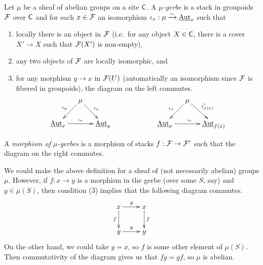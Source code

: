 \begin{definition}
 Let $\mu$ be a sheaf of abelian groups on a site $\text{\sf C}$. A \emph{$\mu$-gerbe} is a stack in groupoids $\mathcal{F}$ over $\text{\sf C}$ and for each $x\in \mathcal{F}$ an isomorphism $\iota_x:\mu\xrightarrow\sim \operatorname{\underline{Aut}}_x$ such that
 \begin{enumerate}
   \item locally there is an object in $\mathcal{F}$ (i.e.~for any object $X\in \text{\sf C}$, there is a cover $X'\to X$ such that $\mathcal{F}(X')$ is non-empty),
   \item any two objects of $\mathcal{F}$ are locally isomorphic, and
   \item for any morphism $y\to x$ in $\mathcal{F}(U)$ (automatically an isomorphism since $\mathcal{F}$ is fibered in groupoids), the diagram on the left commutes.
   \[\xymatrix @R-.5pc @C-1pc{
    & \mu\ar[dl]_{\iota_y} \ar[dr]^{\iota_x}\\
    \aut_x \ar[rr]^\sim & & \aut_y
   }\qquad\qquad\qquad\xymatrix @R-.5pc @C-1pc{
    & \mu\ar[dl]_{\iota_x} \ar[dr]^{\iota'_{f(x)}}\\
    \aut_x \ar[rr]^\sim & & \aut_{f(x)}
   }\]
 \end{enumerate}
 A \emph{morphism of $\mu$-gerbes} is a morphism of stacks $f:\mathcal{F}\to \mathcal{F}'$ such that the diagram on the right commutes.
\end{definition}
\begin{remark}
 We could make the above definition for a sheaf of (not necessarily abelian) groups $\mu$. However, if $f:x\to y$ is a morphism in the gerbe (over some $S$, say) and $g\in\mu(S)$, then condition (3) implies that the following diagram commutes.
 \[\xymatrix{
  x\ar[r]^g\ar[d]_f & x\ar[d]^f\\
  y\ar[r]^g & y
 }\]
 On the other hand, we could take $y=x$, so $f$ is some other element of $\mu(S)$. Then commutativity of the diagram gives us that $fg=gf$, so $\mu$ is abelian.
\end{remark}
%  
